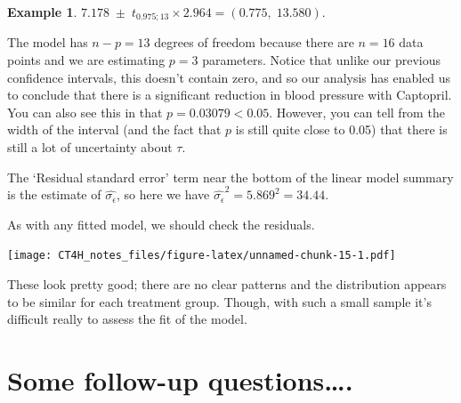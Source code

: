\documentclass[
  openany]{book}
\newenvironment{Shaded}{\begin{snugshade}}{\end{snugshade}}
\newcommand{\AttributeTok}[1]{\textcolor[rgb]{0.13,0.29,0.53}{#1}}
\newcommand{\DecValTok}[1]{\textcolor[rgb]{0.00,0.00,0.81}{#1}}
\newcommand{\FunctionTok}[1]{\textcolor[rgb]{0.13,0.29,0.53}{\textbf{#1}}}
\newcommand{\NormalTok}[1]{#1}
\newcommand{\OtherTok}[1]{\textcolor[rgb]{0.56,0.35,0.01}{#1}}
\newcommand{\SpecialCharTok}[1]{\textcolor[rgb]{0.81,0.36,0.00}{\textbf{#1}}}
\newcommand{\StringTok}[1]{\textcolor[rgb]{0.31,0.60,0.02}{#1}}
\theoremstyle{definition}
\theoremstyle{definition}
\newtheorem{example}{Example}[chapter]
\theoremstyle{definition}
\theoremstyle{definition}
\theoremstyle{remark}
\begin{document}
\begin{example}
\(7.178\; \pm\; t_{0.975;13}\times{2.964} = \left(0.775,\; 13.580\right).\)

The model has \(n-p=13\) degrees of freedom because there are \(n=16\) data points and we are estimating \(p=3\) parameters.
Notice that unlike our previous confidence intervals, this doesn't contain zero, and so our analysis has enabled us to conclude that there is a significant reduction in blood pressure with Captopril. You can also see this in that \(p=0.03079<0.05\). However, you can tell from the width of the interval (and the fact that \(p\) is still quite close to 0.05) that there is still a lot of uncertainty about \(\tau\).

The `Residual standard error' term near the bottom of the linear model summary is the estimate of \(\hat{\sigma_\epsilon}\), so here we have \(\hat{\sigma_\epsilon}^2 = 5.869^2 = 34.44.\)

As with any fitted model, we should check the residuals.

\begin{Shaded}
\end{Shaded}

\texttt{[image: CT4H\_notes\_files/figure-latex/unnamed-chunk-15-1.pdf]}

These look pretty good; there are no clear patterns and the distribution appears to be similar for each treatment group. Though, with such a small sample it's difficult really to assess the fit of the model.
\end{example}

\hypertarget{some-follow-up-questions.}{%
\section{Some follow-up questions\ldots.}\label{some-follow-up-questions.}}
\end{document}
